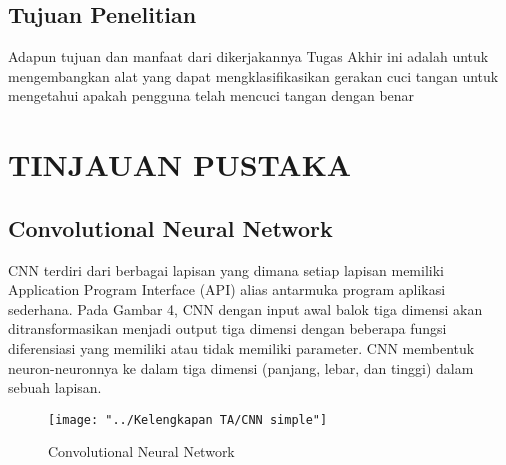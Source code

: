 \documentclass[a4paper]{article}
\begin{document}
		\subsection{Tujuan Penelitian}
			\hspace{11mm}Adapun tujuan dan manfaat dari dikerjakannya Tugas Akhir ini adalah untuk mengembangkan alat yang dapat mengklasifikasikan gerakan cuci tangan untuk mengetahui apakah pengguna telah mencuci tangan dengan benar
	
	\newpage
	\section{TINJAUAN PUSTAKA}
		\subsection{Convolutional Neural Network}
			\hspace{11mm}CNN terdiri dari berbagai lapisan yang dimana setiap lapisan memiliki Application Program Interface (API) alias antarmuka program aplikasi sederhana. Pada Gambar 4, CNN dengan input awal balok tiga dimensi akan ditransformasikan menjadi output tiga dimensi dengan beberapa fungsi diferensiasi yang memiliki atau tidak memiliki parameter. CNN membentuk neuron-neuronnya ke dalam tiga dimensi (panjang, lebar, dan tinggi) dalam sebuah lapisan. 
			
			\begin{figure}[h]
				\centering
				\texttt{[image: "../Kelengkapan TA/CNN simple"]}
				\caption[CNN]{Convolutional Neural Network}
				\label{fig:cnn-simple}
			\end{figure}
			
\end{document}
